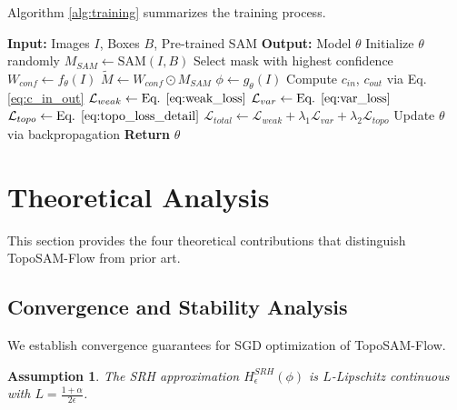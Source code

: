 \documentclass[12pt, a4paper]{article}
\newtheorem{assumption}{Assumption}
\newcommand{\calL}{\mathcal{L}}
\begin{document}
Algorithm \ref{alg:training} summarizes the training process.

\begin{algorithm}[h]
\caption{Training of TopoSAM-Flow}
\label{alg:training}
\begin{algorithmic}[1]
\State \textbf{Input:} Images $I$, Boxes $B$, Pre-trained SAM
\State \textbf{Output:} Model $\theta$
\State Initialize $\theta$ randomly
        \State $M_{SAM} \leftarrow \text{SAM}(I, B)$ 
        \State Select mask with highest confidence
        \State $W_{conf} \leftarrow f_\theta(I)$ 
        \State $\tilde{M} \leftarrow W_{conf} \odot M_{SAM}$
        \State $\phi \leftarrow g_\theta(I)$ 
        \State Compute $c_{in}$, $c_{out}$ via Eq. \ref{eq:c_in_out}
        \State $\calL_{weak} \leftarrow \text{Eq. } \ref{eq:weak_loss}$
        \State $\calL_{var} \leftarrow \text{Eq. } \ref{eq:var_loss}$
        \State $\calL_{topo} \leftarrow \text{Eq. } \ref{eq:topo_loss_detail}$
        \State $\calL_{total} \leftarrow \calL_{weak} + \lambda_1 \calL_{var} + \lambda_2 \calL_{topo}$
        \State Update $\theta$ via backpropagation
    \EndFor
\EndFor
\State \textbf{Return} $\theta$
\end{algorithmic}
\end{algorithm}

\section{Theoretical Analysis}
\label{sec:theory}

This section provides the four theoretical contributions that distinguish TopoSAM-Flow from prior art.

\subsection{Convergence and Stability Analysis}
\label{subsec:convergence}

We establish convergence guarantees for SGD optimization of TopoSAM-Flow.

\begin{assumption}
\label{ass:lipschitz}
The SRH approximation $H_\epsilon^{SRH}(\phi)$ is $L$-Lipschitz continuous with $L = \frac{1+\alpha}{2\epsilon}$.
\end{assumption}
\end{document}
